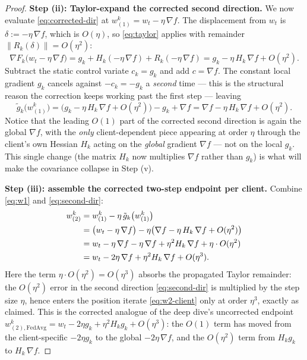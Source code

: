 \documentclass[11pt]{article}
\theoremstyle{definition}
\theoremstyle{remark}
\begin{document}
\begin{proof}
\medskip
\noindent\textbf{Step (ii): Taylor-expand the corrected second direction.}
We now evaluate \eqref{eq:corrected-dir} at $w^{k}_{(1)}=w_t-\eta\,\nabla f$. The displacement
from $w_t$ is $\delta:=-\eta\,\nabla f$, which is $O(\eta)$, so \eqref{eq:taylor} applies with
remainder $\|R_k(\delta)\|=O(\eta^2)$:
\begin{equation}
  \nabla F_k\big(w_t-\eta\,\nabla f\big)
  = g_k + H_k(-\eta\,\nabla f) + R_k(-\eta\,\nabla f)
  = g_k - \eta\,H_k\,\nabla f + O(\eta^2).
  \label{eq:grad-at-w1}
\end{equation}
Subtract the static control variate $c_k=g_k$ and add $c=\nabla f$. The constant local
gradient $g_k$ cancels against $-c_k=-g_k$ a \emph{second} time --- this is the structural
reason the correction keeps working past the first step --- leaving
\begin{equation}
  \tilde g_k\big(w^{k}_{(1)}\big)
  = \big(g_k-\eta\,H_k\,\nabla f+O(\eta^2)\big) - g_k + \nabla f
  = \nabla f - \eta\,H_k\,\nabla f + O(\eta^2).
  \label{eq:second-dir}
\end{equation}
Notice that the leading $O(1)$ part of the corrected second direction is again the global
$\nabla f$, with the \emph{only} client-dependent piece appearing at order $\eta$ through the
client's own Hessian $H_k$ acting on the \emph{global} gradient $\nabla f$ --- not on the
local $g_k$. This single change (the matrix $H_k$ now multiplies $\nabla f$ rather than $g_k$)
is what will make the covariance collapse in Step (v).

\medskip
\noindent\textbf{Step (iii): assemble the corrected two-step endpoint per client.}
Combine \eqref{eq:w1} and \eqref{eq:second-dir}:
\begin{align}
  w^{k}_{(2)}
  &= w^{k}_{(1)} - \eta\,\tilde g_k\big(w^{k}_{(1)}\big) \notag\\
  &= \big(w_t-\eta\,\nabla f\big) - \eta\big(\nabla f-\eta\,H_k\,\nabla f+O(\eta^2)\big) \notag\\
  &= w_t - \eta\,\nabla f - \eta\,\nabla f + \eta^2 H_k\,\nabla f + \eta\cdot O(\eta^2) \notag\\
  &= w_t - 2\eta\,\nabla f + \eta^2 H_k\,\nabla f + O(\eta^3).
  \label{eq:w2-client}
\end{align}
Here the term $\eta\cdot O(\eta^2)=O(\eta^3)$ absorbs the propagated Taylor remainder: the
$O(\eta^2)$ error in the second direction \eqref{eq:second-dir} is multiplied by the step size
$\eta$, hence enters the position iterate \eqref{eq:w2-client} only at order $\eta^3$, exactly
as claimed. This is the corrected analogue of the deep dive's uncorrected endpoint
$w^{k}_{(2),\mathrm{FedAvg}}=w_t-2\eta g_k+\eta^2 H_k g_k+O(\eta^3)$: the $O(1)$ term has moved
from the client-specific $-2\eta g_k$ to the global $-2\eta\,\nabla f$, and the $O(\eta^2)$
term from $H_k g_k$ to $H_k\,\nabla f$.


\end{proof}
\end{document}
